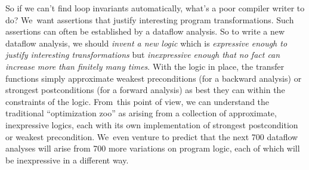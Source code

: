 \documentclass[blockstyle,preprint,natbib,nocopyrightspace]{sigplanconf}
\newcommand\join{\sqcup}
\newcommand\true{\ensuremath{\mathbf{true}}}
\newcommand\implies{\supseteq}  %
\newcommand\secref[1]{Section~\ref{sec:#1}}
\begin{document}
So if we can't find loop invariants automatically, what's a poor
compiler writer to do?
We~want assertions that justify interesting program
transformations. 
Such assertions can often be established by a dataflow analysis.
So to write a new dataflow analysis, we
should \emph{invent a new logic} which is
\emph{expressive enough to justify interesting transformations}
but \emph{inexpressive enough that no fact can increase more than
finitely many times}.
With the logic in place, the transfer functions simply approximate
  weakest preconditions (for a backward analysis) or strongest
  postconditions (for a forward analysis) as best they can within the
  constraints of the logic.
From~this point of view, we can understand the traditional
``optimization zoo'' as arising from a collection of approximate,
inexpressive logics, each with its own implementation of strongest postcondition
or weakest precondition. 
We~even venture to predict that the next 700 dataflow analyses will
arise from 700 more variations on 
program logic, each of which will be inexpressive in a different way.



\end{document}
